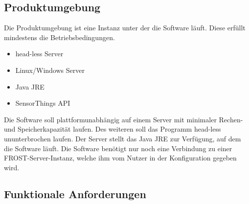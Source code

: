 \documentclass[12 pt]{article}
\begin{document}
\subsection{Produktumgebung}
Die Produktumgebung ist eine Instanz unter der die Software läuft. Diese erfüllt mindestens die Betriebsbedingungen.
\begin{itemize}
\item head-less Server
\item Linux/Windows Server
\item Java JRE
\item SensorThings API
\end{itemize}
Die Software soll plattformunabhängig auf einem Server mit minimaler Rechen- und Speicherkapazität laufen. Des weiteren soll das Programm head-less ununterbrochen laufen. Der Server stellt das Java JRE zur Verfügung, auf dem die Software läuft. Die Software benötigt nur noch eine Verbindung zu einer FROST-Server-Instanz, welche ihm vom Nutzer in der Konfiguration gegeben wird.

\subsection{Funktionale Anforderungen}
\end{document}
